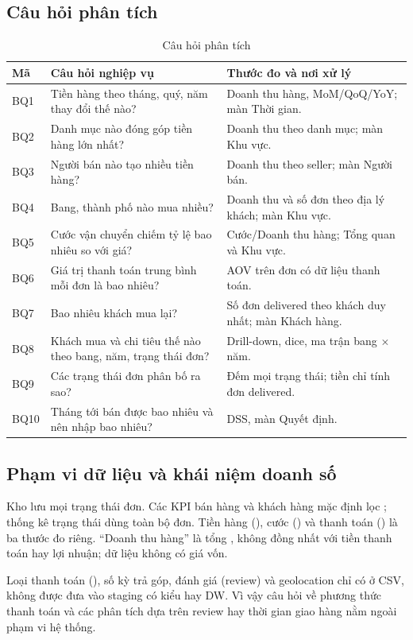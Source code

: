 \subsection{Câu hỏi phân tích}
\begin{table}[H]\centering\small\renewcommand{\arraystretch}{1.15}
\begin{tabularx}{\linewidth}{lYY}
\toprule Mã & Câu hỏi nghiệp vụ & Thước đo và nơi xử lý\\\midrule
BQ1 & Tiền hàng theo tháng, quý, năm thay đổi thế nào? & Doanh thu hàng, MoM/QoQ/YoY; màn Thời gian.\\
BQ2 & Danh mục nào đóng góp tiền hàng lớn nhất? & Doanh thu theo danh mục; màn Khu vực.\\
BQ3 & Người bán nào tạo nhiều tiền hàng? & Doanh thu theo seller; màn Người bán.\\
BQ4 & Bang, thành phố nào mua nhiều? & Doanh thu và số đơn theo địa lý khách; màn Khu vực.\\
BQ5 & Cước vận chuyển chiếm tỷ lệ bao nhiêu so với giá? & Cước/Doanh thu hàng; Tổng quan và Khu vực.\\
BQ6 & Giá trị thanh toán trung bình mỗi đơn là bao nhiêu? & AOV trên đơn có dữ liệu thanh toán.\\
BQ7 & Bao nhiêu khách mua lại? & Số đơn delivered theo khách duy nhất; màn Khách hàng.\\
BQ8 & Khách mua và chi tiêu thế nào theo bang, năm, trạng thái đơn? & Drill-down, dice, ma trận bang $\times$ năm.\\
BQ9 & Các trạng thái đơn phân bố ra sao? & Đếm mọi trạng thái; tiền chỉ tính đơn delivered.\\
BQ10 & Tháng tới bán được bao nhiêu và nên nhập bao nhiêu? & DSS, màn Quyết định.\\
\bottomrule\end{tabularx}
\caption{Câu hỏi phân tích}\label{tab:bq}
\end{table}

\subsection{Phạm vi dữ liệu và khái niệm doanh số}
Kho lưu mọi trạng thái đơn. Các KPI bán hàng và khách hàng mặc định lọc ; thống kê trạng thái dùng toàn bộ đơn. Tiền hàng (), cước () và thanh toán () là ba thước đo riêng. ``Doanh thu hàng'' là tổng , không đồng nhất với tiền thanh toán hay lợi nhuận; dữ liệu không có giá vốn.

Loại thanh toán (), số kỳ trả góp, đánh giá (review) và geolocation chỉ có ở CSV, không được đưa vào staging có kiểu hay DW. Vì vậy câu hỏi về phương thức thanh toán và các phân tích dựa trên review hay thời gian giao hàng nằm ngoài phạm vi hệ thống.
